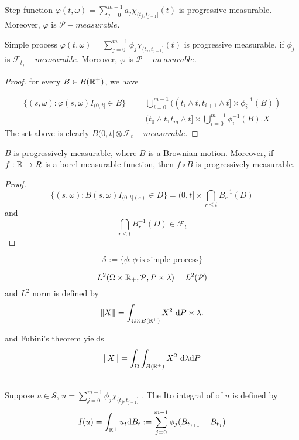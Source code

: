 \documentclass[12pt]{book}
\begin{document}
\begin{example}
Step function $\varphi(t,\omega)= \sum_{j=0}^{m-1}a_j \chi_{(t_j,t_{j+1}]}(t)$ is progressive measurable. Moreover, $\varphi $ is $ \mathcal P - measurable$.
\end{example}

\begin{example}
Simple process $\varphi(t,\omega)= \sum_{j=0}^{m-1}\phi_j \chi_{(t_j,t_{j+1}]}(t)$ is progressive measurable, if $\phi_j$ is $\mathcal{F}_{t_j}-measurable$. Moreover, $\varphi $ is $ \mathcal P - measurable$.
\end{example}
\begin{proof}
for every $B \in B(\mathbb{R}^+)$, we have

\begin{eqnarray*}
\{(s,\omega):\varphi(s,\omega)I_{(0,t]}\in B\} &=& \bigcup_{i=0}^{m-1} ((t_i\wedge t,t_{i+1}\wedge t] \times \phi^{-1}_i(B))	\\
&=& (t_0 \wedge t, t_m \wedge t] \times \bigcup_{i=0}^{m-1} \phi_i^{-1}(B). X
\end{eqnarray*} 
The set above is clearly $B(0,t] \otimes \mathcal{F}_t - measurable$.

\end{proof}

\begin{example}
$B$ is progressively measurable, where $B$ is a Brownian motion.	 Moreover, if $f:\mathbb{R} \to R$ is a borel measurable function, then $f \circ B$ is progressively measurable.
\end{example}
\begin{proof}
$$
\{(s,\omega): B(s,\omega)I_{(0,t](s)}\in D\} = (0,t] \times \bigcap_{r\leq t}B_r^{-1}(D)
$$
and 
$$
\bigcap_{r\leq t}B_r^{-1}(D) \in \mathcal{F}_t
$$
\end{proof}

\begin{definition}
$$
\mathcal{S} := \{\phi: \phi \ \text{is simple process}\}
$$
\end{definition}

\begin{definition} 
	$$
	L^2(\Omega \times \mathbb{R}_+, \mathcal{P},P\times\lambda) = L^2(\mathcal P)
	$$
and $L^2$ norm is defined by
$$
\| X\|= \int_{\Omega \times B(\mathbb{R}^+)} X^2\  \mathrm{d} P \times \lambda.
$$
\end{definition}
and Fubini's theorem yields
$$
\| X \| = \int_\Omega \int_{B(\mathbb{R}^+)} X^2 \ \mathrm{d} \lambda \mathrm{d} P
$$



\begin{definition} \ \\
Suppose $u \in \mathcal S$, $u = \sum_{j=0}^{m-1}\phi_j \chi_{(t_j,t_{j+1}]}$
. The Ito integral of of $u$ is defined by
$$
I(u) = \int_{\mathbb{R}^+} u_t \mathrm{d} B_t := \sum_{j=0}^{m-1} \phi_j(B_{t_{j+1}}-B_{t_j})
$$	
\end{definition}
\end{document}
